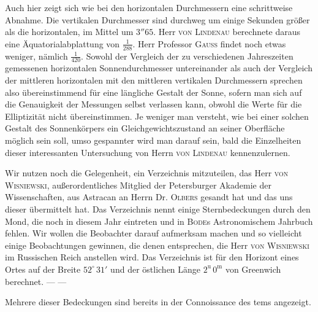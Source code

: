 Auch hier zeigt sich wie bei den horizontalen Durchmessern eine schrittweise Abnahme. Die vertikalen Durchmesser sind durchweg um einige Sekunden größer als die horizontalen, im Mittel um $3''65$. Herr \textsc{von Lindenau} berechnete daraus eine Äquatorialabplattung von $\tfrac{1}{288}$. Herr Professor \textsc{Gauss} findet noch etwas weniger, nämlich $\tfrac{1}{420}$. Sowohl der Vergleich der zu verschiedenen Jahreszeiten gemessenen horizontalen Sonnendurchmesser untereinander als auch der Vergleich der mittleren horizontalen mit den mittleren vertikalen Durchmessern sprechen also übereinstimmend für eine längliche Gestalt der Sonne, sofern man sich auf die Genauigkeit der Messungen selbst verlassen kann, obwohl die Werte für die Elliptizität nicht übereinstimmen. Je weniger man versteht, wie bei einer solchen Gestalt des Sonnenkörpers ein Gleichgewichtszustand an seiner Oberfläche möglich sein soll, umso gespannter wird man darauf sein, bald die Einzelheiten dieser interessanten Untersuchung von Herrn \textsc{von Lindenau} kennenzulernen.

Wir nutzen noch die Gelegenheit, ein Verzeichnis mitzuteilen, das Herr \textsc{von Wisniewski}, außerordentliches Mitglied der Petersburger Akademie der Wissenschaften, aus Astracan an Herrn Dr. \textsc{Olbers} gesandt hat und das uns dieser übermittelt hat. Das Verzeichnis nennt einige Sternbedeckungen durch den Mond, die noch in diesem Jahr eintreten und in \textsc{Bode}s Astronomischem Jahrbuch fehlen. Wir wollen die Beobachter darauf aufmerksam machen und so vielleicht einige Beobachtungen gewinnen, die denen entsprechen, die Herr \textsc{von Wisniewski} im Russischen Reich anstellen wird. Das Verzeichnis ist für den Horizont eines Ortes auf der Breite $52^{\circ}\,31'$ und der östlichen Länge $2^{\mathrm u}\,0^{\mathrm m}$ von Greenwich berechnet. — —

Mehrere dieser Bedeckungen sind bereits in der Connoissance des tems angezeigt.

